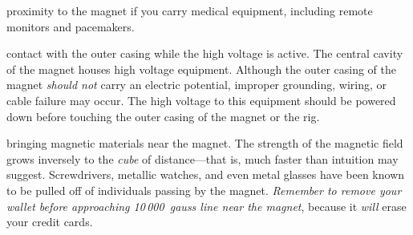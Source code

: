 \begin{avoid} proximity to the magnet if you carry medical equipment, including remote monitors and pacemakers.\end{avoid}

\begin{avoid} contact with the outer casing while the high voltage is active.  The central cavity of the magnet houses high voltage equipment.  Although the outer casing of the magnet \textit{should not} carry an electric potential, improper grounding, wiring, or cable failure may occur.  The high voltage to this equipment should be powered down before touching the outer casing of the magnet or the rig.\end{avoid}

\begin{avoid} bringing magnetic materials near the magnet.  The strength of the magnetic field grows inversely to the \textit{cube} of distance---that is, much faster than intuition may suggest.  Screwdrivers, metallic watches, and even metal glasses have been known to be pulled off of individuals passing by the magnet.  \textit{Remember to remove your wallet before approaching 10\,000~gauss line near the magnet}, because it \textit{will} erase your credit cards.\end{avoid}


